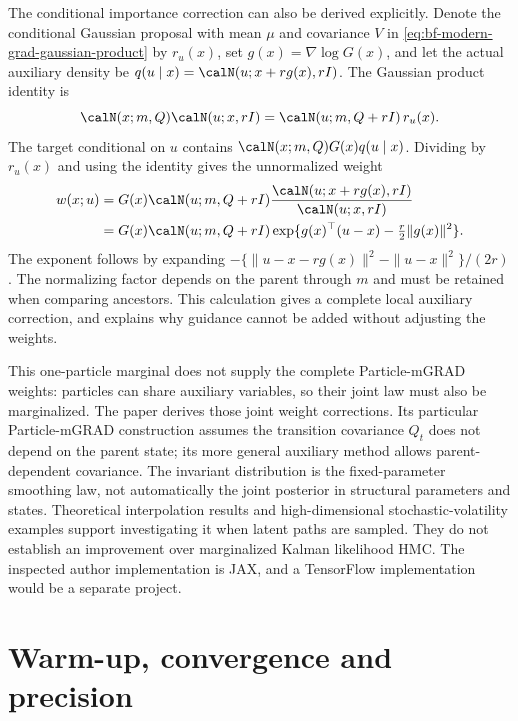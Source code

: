 The conditional importance correction can also be derived explicitly.
Denote the conditional Gaussian proposal with mean $\mu$ and covariance
$V$ in \eqref{eq:bf-modern-grad-gaussian-product} by $r_u(x)$, set
$g(x)=\nabla\log G(x)$, and let the actual auxiliary density be
$q(u\mid x)=\calN(u;x+rg(x),rI)$. The Gaussian product identity is
\begin{equation}
 \calN(x;m,Q)\calN(u;x,rI)
    =\calN(u;m,Q+rI)\,r_u(x).
 \label{eq:bf-modern-grad-product-density}
\end{equation}
The target conditional on $u$ contains
$\calN(x;m,Q)G(x)q(u\mid x)$. Dividing by $r_u(x)$ and using the
identity gives the unnormalized weight
\begin{align}
 w(x;u)&=G(x)\calN(u;m,Q+rI)
       \frac{\calN(u;x+rg(x),rI)}{\calN(u;x,rI)}\\
 &=G(x)\calN(u;m,Q+rI)
       \exp\{g(x)^\top(u-x)-\tfrac r2\|g(x)\|^2\}.
 \label{eq:bf-modern-grad-conditional-weight}
\end{align}
The exponent follows by expanding
$-\{\|u-x-rg(x)\|^2-\|u-x\|^2\}/(2r)$.
The normalizing factor depends on the parent through $m$ and must be
retained when comparing ancestors. This calculation gives a complete
local auxiliary correction, and explains why guidance cannot be added
without adjusting the weights.

This one-particle marginal does not supply the complete Particle-mGRAD
weights: particles can share auxiliary variables, so their joint law must
also be marginalized. The paper derives those joint weight corrections. Its
particular Particle-mGRAD construction assumes the transition covariance
$Q_t$ does not depend on the parent state; its more general auxiliary method
allows parent-dependent covariance. The invariant distribution is the
fixed-parameter smoothing law, not automatically the joint posterior in
structural parameters and states. Theoretical interpolation results and
high-dimensional stochastic-volatility examples support investigating it
when latent paths are sampled. They do not establish an improvement over
marginalized Kalman likelihood HMC. The inspected author implementation is
JAX, and a TensorFlow implementation would be a separate project.

\section{Warm-up, convergence and precision}
\label{sec:bf-modern-diagnostics}

